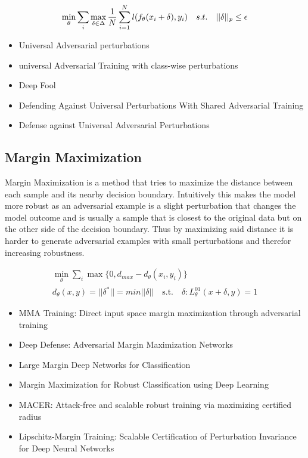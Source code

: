 \documentclass[conference]{IEEEtran}
\begin{document}
\begin{align*}
  \min_{\theta} \sum_i \max_{\delta \in \Delta} \space \frac{1}{N} \sum_{i=1}^N \space l(f_{\theta}(x_i + \delta), y_i) \quad s.t. \quad ||\delta||_p \leq \epsilon
\end{align*}

\begin{itemize}
  \item Universal Adversarial perturbations \cite{b10}
  \item universal Adversarial Training with class-wise perturbations \cite{b11}
  \item Deep Fool
  \item Defending Against Universal Perturbations With Shared Adversarial Training \cite{b12}
  \item Defense against Universal Adversarial Perturbations \cite{b13}
\end{itemize}

\subsection{Margin Maximization} \cite{b1}
Margin Maximization is a method that tries to maximize the distance between each sample and its nearby decision boundary. Intuitively this makes the model more robust as an adversarial example is a slight perturbation that changes the model outcome and is usually a sample that is closest to the original data but on the other side of the decision boundary. Thus by maximizing said distance it is harder to generate adversarial examples with small perturbations and therefor increasing robustness.

\begin{align*}
  \min_{\theta} \sum_i \max \{0, d_{max} - d_\theta(x_i, y_i)\} \\
  d_\theta(x,y) = ||\delta^*|| = min ||\delta|| \quad \text{s.t.} \quad \delta: L_\theta^{01}(x+\delta, y) = 1
\end{align*}

\begin{itemize}
  \item MMA Training: Direct input space margin maximization through adversarial training\cite{b1}
  \item Deep Defense: Adversarial Margin Maximization Networks \cite{b14}
  \item Large Margin Deep Networks for Classification \cite{b15}
  \item Margin Maximization for Robust Classification using Deep Learning \cite{b16}
  \item MACER: Attack-free and scalable robust training via maximizing certified radius \cite{b17}
  \item Lipschitz-Margin Training: Scalable Certification of Perturbation Invariance for Deep Neural Networks \cite{b18}
\end{itemize}
\end{document}
